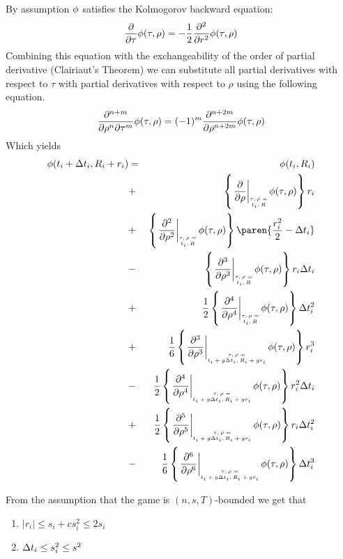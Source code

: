 \documentclass{article}[12pt]
\begin{document}
{By assumption $\phi$ satisfies the Kolmogorov backward equation:
\begin{equation*} 
  \frac{\partial}{\partial \tau} \phi(\tau,\rho)
  = -\frac{1}{2} \frac{\partial^2}{\partial r^2} \phi(\tau,\rho)
\end{equation*}
Combining this equation with the exchangeability of the order of
partial derivative (Clairiaut's Theorem) we can substitute all
partial derivatives with respect to $\tau$ with partial derivatives
with respect to $\rho$ using the following equation.
\[
  \frac{\partial^{n+m}}{\partial \rho^n \partial \tau^m} \phi(\tau,\rho)=
  (-1)^m \frac{\partial^{n+2m}}{\partial \rho^{n+2m}} \phi(\tau,\rho)
\]
Which yields
\begin{eqnarray}
      \pot(t_i+\deltat_i,\R_i+r_i) & =&  
    \pot(t_i,\R_i)\\
    &+& \at{\frac{\partial}{\partial \rho}} r_i \label{term:coll1}\\
    &+& \at{\frac{\partial^2}{\partial \rho^2}} \paren{\frac{r_i^2}{2}-\deltat_i} \label{term:coll2}\\
    &-& \at{\frac{\partial^3}{\partial \rho^3}} r_i \deltat_i \label{term:coll3}\\
    &+& \frac{1}{2} \at{\frac{\partial^4}{\partial \rho^4}} \deltat_i^2 \label{term:coll4}\\
    &+& \frac{1}{6} \att{\frac{\partial^3}{\partial \rho^3}} r_i^3 \label{term:coll5}\\
    &-& \frac{1}{2} \att{\frac{\partial^4}{\partial \rho^4}} r_i^2\deltat_i \label{term:coll6}\\
    &+& \frac{1}{2} \att{\frac{\partial^5}{\partial \rho^5}} r_i\deltat_i^2 \label{term:coll7}\\
    &-& \frac{1}{6} \att{\frac{\partial^6}{\partial \rho^6}} \deltat_i^3 \label{term:coll8}
\end{eqnarray}

  From the assumption that the game is $(n,s,T)$-bounded we get that 
  \begin{enumerate}
  \item $|r_i| \leq s_i +c s_i^2 \leq 2 s_i$
  \item $\Delta t_i \leq s_i^2 \leq s^2$
  \end{enumerate}

}
\end{document}

